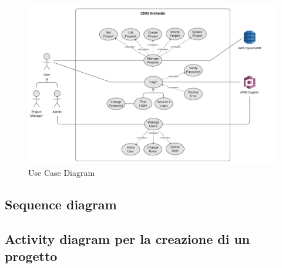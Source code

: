 \documentclass[target=bach,aauheader=,style=]{thud}
\begin{document}
\begin{figure}[htbp]
    \centering
    \includegraphics[width=1\textwidth]{img/diagrammi/use_case.pdf} 
    \caption{Use Case Diagram}
\end{figure}


\subsection{Sequence diagram}
\subsection{Activity diagram per la creazione di un progetto}





\end{document}
